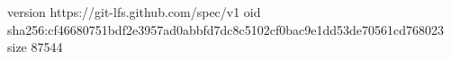 version https://git-lfs.github.com/spec/v1
oid sha256:cf46680751bdf2e3957ad0abbfd7dc8c5102cf0bac9e1dd53de70561cd768023
size 87544
